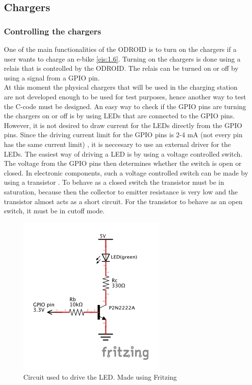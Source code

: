 \subsection{Chargers}\label{sec:chargers}
\subsubsection{Controlling the chargers}
One of the main functionalities of the ODROID is to turn on the chargers if a user wants to charge an e-bike \ref{eis:1.6}. Turning on the chargers is done using a relais that is controlled by the ODROID. The relais can be turned on or off by using a signal from a GPIO pin.\\

At this moment the physical chargers that will be used in the charging station are not developed enough to be used for test purposes, hence another way to test the C-code must be designed. An easy way to check if the GPIO pins are turning the chargers on or off is by using LEDs that are connected to the GPIO pins. However, it is not desired to draw current for the LEDs directly from the GPIO pins. Since the driving current limit for the GPIO pins is 2-4 mA (not every pin has the same current limit) \cite{odroid_currentlimit}, it is neccesary to use an external driver for the LEDs. The easiest way of driving a LED is by using a voltage controlled switch. The voltage from the GPIO pins then determines whether the switch is open or closed. In electronic components, such a voltage controlled switch can be made by using a transistor \cite{switch_transistor}. To behave as a closed switch the transistor must be in saturation, because then the collector to emitter resistance is very low and the transistor almost acts as a short circuit. For the transistor to behave as an open switch, it must be in cutoff mode.\\

\begin{figure}[!ht]
  \centering
    \includegraphics[scale=1.5]{images/led_driver_schem.pdf}
      \caption{Circuit used to drive the LED. Made using Fritzing \cite{fritzing}}\label{fig:leddriver}
\end{figure}

